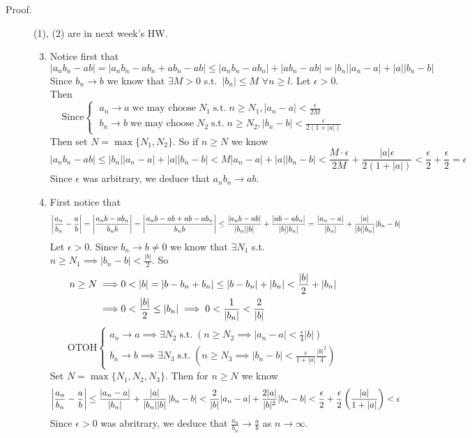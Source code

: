 \documentclass[letterpaper,11pt]{article}
\begin{document}
\begin{description}
\item[Proof.] (1), (2) are in next week's HW.
    \begin{enumerate}[(1)]
    \setcounter{enumi}{2}
    \item Notice first that \[
        |a_nb_n-ab|=|a_nb_n-ab_n+ab_n-ab|\le
        |a_nb_n-ab_n|+|ab_n-ab|=|b_n||a_n-a|+|a||b_n-b|
        \]
        Since $b_n\to b$ we know that $\exists M>0$ s.t.\
        $|b_n|\le M$ $\forall n\ge l$. Let $\epsilon>0$. Then
        \[\text{Since}
        \begin{cases}
        \;a_n\to a\;\text{we may choose}\; N_1
            \;\text{s.t.}\; n\ge N_1, |a_n-a|<\frac{\epsilon}{2M}\\
        \;b_n\to b\;\text{we may choose}\; N_2
            \;\text{s.t.}\; n\ge N_2, |b_n-b|<\frac{\epsilon}{2(1+|a|)}
        \end{cases}
        \]
        Then set $N=\max\{N_1,N_2\}$. So if $n\ge N$ we know
        \[
        |a_nb_n-ab|\le|b_n||a_n-a|+|a||b_n-b|<M|a_n-a|+|a||b_n-b|<
        \frac{M\cdot\epsilon}{2M}+\frac{|a|\epsilon}{2(1+|a|)}<
        \frac{\epsilon}{2}+\frac{\epsilon}{2}=\epsilon
        \]
        Since $\epsilon$ was arbitrary, we deduce that $a_nb_n\to ab$.

    \item First notice that \[
        \left|\frac{a_n}{b_n}-\frac{a}{b}\right|=\left|\frac{a_nb-ab_n}{b_nb}\right|=
        \left|\frac{a_nb-ab+ab-ab_n}{b_nb}\right|\le\frac{\left|a_nb-ab\right|}{|b_n||b|}
        +\frac{\left|ab-ab_n\right|}{|b||b_n|}=\frac{\left|a_n-a\right|}{|b_n|}+
        \frac{|a|}{|b||b_n|}|b_n-b|
        \]
        Let $\epsilon>0$. Since $b_n\to b\ne0$ we know that $\exists N_1$
        s.t.\ $n\ge N_1\implies|b_n-b|<\frac{|b|}{2}$. So
        \begin{align*}
        n\ge N\implies& 0<|b|=|b-b_n+b_n|\le|b-b_n|+|b_n|<\frac{|b|}{2}+|b_n|\\
        \implies& 0<\frac{|b|}{2}\le|b_n|\implies0<\oneOver{|b_n|}<\frac{2}{|b|}
        \end{align*}
        \[
        \text{OTOH}
        \begin{cases}
        a_n\to a\implies\exists N_2\;\text{s.t.}\;
          \left(n\ge N_2\implies |a_n-a|<\frac{\epsilon}{4}|b|\right)\\
        b_n\to b\implies\exists N_3\;\text{s.t.}\;
          \left(n\ge N_3\implies|b_n-b|<\frac{\epsilon}{1+|a|}\frac{|b|^2}{4}\right)
        \end{cases}
        \]
        Set $N=\max\{N_1,N_2,N_3\}$. Then for $n\ge N$ we know
        \[
        \left|\frac{a_n}{b_n}-\frac{a}{b}\right|\le\frac{\left|a_n-a\right|}{|b_n|}+
        \frac{|a|}{|b_n||b|}\left|b_n-b\right|<\frac{2}{|b|}|a_n-a|+
        \frac{2|a|}{|b|^2}|b_n-b|<\frac{\epsilon}{2}+\frac{\epsilon}{2}
        \left(\frac{|a|}{1+|a|}\right)<\epsilon
        \]
        Since $\epsilon>0$ was abritrary, we deduce that
        $\frac{a_n}{b_n}\to\frac{a}{b}$ as $n\to\infty$.
    \end{enumerate}



\end{description}
\end{document}

